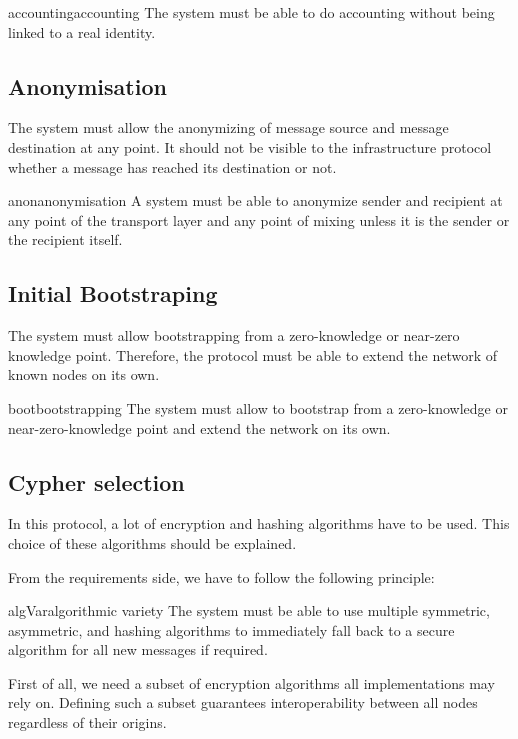 \begin{requirement}{accounting}{accounting}
	The system must be able to do accounting without being linked to a real identity.
\end{requirement}

\subsection{Anonymisation}
The system must allow the anonymizing of message source and message destination at any point. It should not be visible to the infrastructure protocol whether a message has reached its destination or not. 

\begin{requirement}{anon}{anonymisation}
	A system must be able to anonymize sender and recipient at any point of the transport layer and any point of mixing unless it is the sender or the recipient itself.
\end{requirement}

\subsection{Initial Bootstraping}
The system must allow bootstrapping from a zero-knowledge or near-zero knowledge point. Therefore, the protocol must be able to extend the network of known nodes on its own.

\begin{requirement}{boot}{bootstrapping}
	The system must allow to bootstrap from a zero-knowledge or near-zero-knowledge point and extend the network on its own. 
\end{requirement}

\subsection{Cypher selection}
In this protocol, a lot of encryption and hashing algorithms have to be used. This choice of these algorithms should be explained. 

From the requirements side, we have to follow the following principle:
\begin{requirement}{algVar}{algorithmic variety}
	The system must be able to use multiple symmetric, asymmetric, and hashing algorithms to immediately fall back to a secure algorithm for all new messages if required. 
\end{requirement}

First of all, we need a subset of encryption algorithms all implementations may rely on. Defining such a subset guarantees interoperability between all nodes regardless of their origins. 


